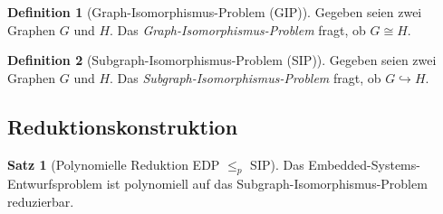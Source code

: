 ﻿\documentclass[a4paper,12pt]{article}
\theoremstyle{definition}
\newtheorem{definition}{Definition}
\newtheorem{satz}{Satz}
\begin{document}
\begin{definition}[Graph-Isomorphismus-Problem (GIP)]
    Gegeben seien zwei Graphen $G$ und $H$. Das
    \emph{Graph-Isomorphismus-Problem} fragt, ob $G \cong H$.
\end{definition}

\begin{definition}[Subgraph-Isomorphismus-Problem (SIP)]
    Gegeben seien zwei Graphen $G$ und $H$. Das
    \emph{Subgraph-Isomorphismus-Problem} fragt, ob $G \hookrightarrow H$.
\end{definition}

\subsection{Reduktionskonstruktion}

\begin{satz}[Polynomielle Reduktion EDP $\leq_p$ SIP]\label{satz:reduktion}
    Das Embedded-Systems-Entwurfsproblem ist polynomiell auf das
    Subgraph-Isomorphismus-Problem reduzierbar.
\end{satz}
\end{document}
